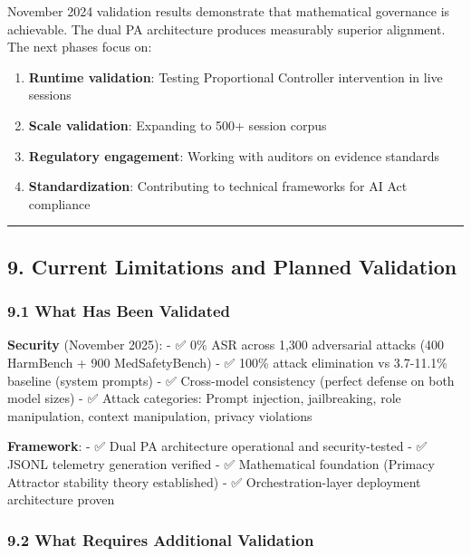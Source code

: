 November 2024 validation results demonstrate that mathematical
governance is achievable. The dual PA architecture produces measurably
superior alignment. The next phases focus on:

\begin{enumerate}
\def\labelenumi{\arabic{enumi}.}
\tightlist
\item
  \textbf{Runtime validation}: Testing Proportional Controller
  intervention in live sessions
\item
  \textbf{Scale validation}: Expanding to 500+ session corpus
\item
  \textbf{Regulatory engagement}: Working with auditors on evidence
  standards
\item
  \textbf{Standardization}: Contributing to technical frameworks for AI
  Act compliance
\end{enumerate}

\begin{center}\rule{0.5\linewidth}{0.5pt}\end{center}

\subsection{9. Current Limitations and Planned
Validation}\label{current-limitations-and-planned-validation}

\subsubsection{9.1 What Has Been
Validated}\label{what-has-been-validated}

\textbf{Security} (November 2025): - ✅ 0\% ASR across 1,300 adversarial
attacks (400 HarmBench + 900 MedSafetyBench) - ✅ 100\% attack
elimination vs 3.7-11.1\% baseline (system prompts) - ✅ Cross-model
consistency (perfect defense on both model sizes) - ✅ Attack
categories: Prompt injection, jailbreaking, role manipulation, context
manipulation, privacy violations

\textbf{Framework}: - ✅ Dual PA architecture operational and
security-tested - ✅ JSONL telemetry generation verified - ✅
Mathematical foundation (Primacy Attractor stability theory established)
- ✅ Orchestration-layer deployment architecture proven

\subsubsection{9.2 What Requires Additional
Validation}\label{what-requires-additional-validation}

